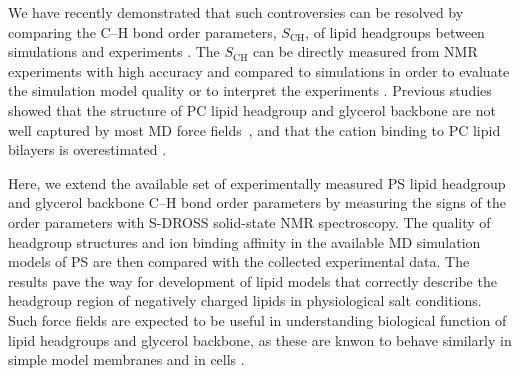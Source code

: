 \documentclass[aps,prl,superscriptaddress,twocolumn]{revtex4}
\begin{document}
We have recently demonstrated that such controversies can be resolved by
comparing the C--H bond order parameters, $S_\mathrm{CH}$, of lipid headgroups between simulations
and experiments \cite{botan15,catte16}. The $S_\mathrm{CH}$ can be directly
measured from NMR experiments with high accuracy and compared to simulations
in order to evaluate the simulation model quality or to interpret the experiments \cite{ollila16}.
Previous studies showed that the structure of PC lipid headgroup and glycerol backbone are not well
captured by most MD force fields~\cite{botan15}, and that the cation binding to PC
lipid bilayers is overestimated \cite{catte16}.
%

Here, we extend the available set of experimentally measured PS lipid headgroup and
glycerol backbone C--H bond order parameters
by measuring the signs of the order parameters with S-DROSS solid-state NMR spectroscopy.
The quality of headgroup structures and ion binding affinity in
the available MD simulation models of PS are then compared with the collected experimental data.
The results pave the way
for development of lipid models that correctly describe 
the headgroup region of negatively charged lipids in physiological salt
conditions. Such force fields are expected to be useful in understanding
biological function of lipid headgroups and glycerol backbone, as
these are knwon to behave similarly in simple model membranes and in cells \cite{gally81,scherer87,seelig90}.
\end{document}

